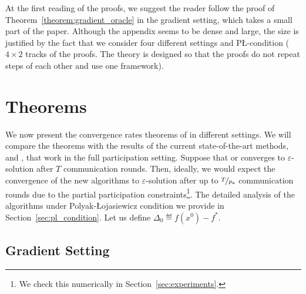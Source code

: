 \documentclass{article}
\newcommand{\alexander}[1]{\todo[inline]{\textbf{Alexander: }#1}}
\newcommand{\algorithmname}{DASHA-PP}
\newcommand*{\probavailable}{\ensuremath{p_{\textnormal{a}}}}
\newcommand*{\probpage}{\ensuremath{p_{\text{page}}}}
\begin{document}

At the first reading of the proofs, we suggest the reader follow the proof of Theorem~\ref{theorem:gradient_oracle} in the gradient setting, which takes a small part of the paper. Although the appendix seems to be dense and large, the size is justified by the fact that we consider four different settings and P\L-condition ($4 \times 2$ tracks of the proofs. The theory is designed so that the proofs do not repeat steps of each other and use one framework).



\section{Theorems}

\label{sec:theorems}

We now present the convergence rates theorems of \algname{\algorithmname} in different settings. We will compare the theorems with the results of the current state-of-the-art methods,  and , that work in the full participation setting. Suppose that  or  converges to $\varepsilon$-solution after $T$ communication rounds. Then, ideally, we would expect the convergence of the new algorithms to $\varepsilon$-solution after up to $\nicefrac{T}{\probavailable}$ communication rounds due to the partial participation constraints\footnote{We check this numerically in Section~\ref{sec:experiments}.}. The detailed analysis of the algorithms under Polyak-\L ojasiewicz condition we provide in Section~\ref{sec:pl_condition}. Let us define $\Delta_0 \eqdef f(x^0) - f^*.$

\subsection{Gradient Setting}
\end{document}
